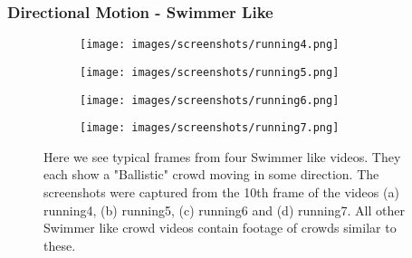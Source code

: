 \documentclass[10pt]{article}
\begin{document}
\subsubsection{Directional Motion - Swimmer Like}
\begin{figure}[H]
\begin{subfigure}[t]{.49\textwidth}
  \centering
  \texttt{[image: images/screenshots/running4.png]}
  \label{fig:running4_screenshot}
  \caption{}
\end{subfigure}%
\hfill
\begin{subfigure}[t]{.49\textwidth}
  \centering
  \texttt{[image: images/screenshots/running5.png]}
  \label{fig:running5_screenshot}
  \caption{}
\end{subfigure}
\par\bigskip
\begin{subfigure}[t]{.49\textwidth}
  \centering
  \texttt{[image: images/screenshots/running6.png]}
  \label{fig:running6_screenshot}
  \caption{}
\end{subfigure}%
\hfill
\begin{subfigure}[t]{.49\textwidth}
  \centering
  \texttt{[image: images/screenshots/running7.png]}
  \label{fig:running7_screenshot}
  \caption{}
\end{subfigure}%
\caption{Here we see typical frames from four Swimmer like videos. They each show a "Ballistic" crowd moving in some direction. The screenshots were captured from the 10th frame of the videos (a) running4, (b) running5, (c) running6 and (d) running7. All other Swimmer like crowd videos contain footage of crowds similar to these.}
\label{fig:running_screenshots}
\end{figure}
\end{document}
